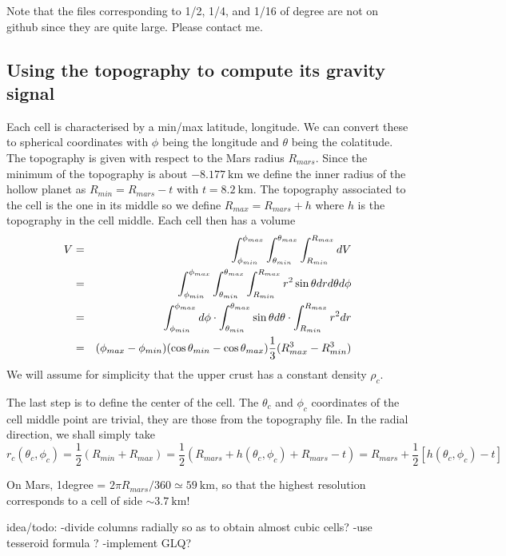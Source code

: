 Note that the files corresponding to 1/2, 1/4, and 1/16 of degree are not on github since they are quite large. 
Please contact me.

\subsection*{Using the topography to compute its gravity signal}

Each cell is characterised by a min/max latitude, longitude. We can convert these to 
spherical coordinates with $\phi$ being the longitude and $\theta$ being the colatitude.
The topography is given with respect to the Mars radius $R_{mars}$. Since the minimum 
of the topography is about $-8.177~\si{\km}$ we define the inner radius of the hollow planet 
as $R_{min}=R_{mars}-t$ with $t=8.2~\si{\km}$. The topography associated to the cell 
is the one in its middle so we define $R_{max}=R_{mars}+h$ where $h$ is the topography 
in the cell middle. Each cell then has a volume
\begin{eqnarray}
V
&=&
\int_{\phi_{min}}^{\phi_{max}}
\int_{\theta_{min}}^{\theta_{max}}
\int_{R_{min}}^{R_{max}}
dV \nonumber\\
&=&
\int_{\phi_{min}}^{\phi_{max}}
\int_{\theta_{min}}^{\theta_{max}}
\int_{R_{min}}^{R_{max}}
r^2 \sin\theta dr d\theta d\phi \nonumber\\
&=&
\int_{\phi_{min}}^{\phi_{max}} d\phi \cdot
\int_{\theta_{min}}^{\theta_{max}} \sin\theta d\theta \cdot 
\int_{R_{min}}^{R_{max}} r^2 dr\nonumber\\
&=&
(\phi_{max} -\phi_{min})
(\cos \theta_{min} -\cos\theta_{max})
\frac13 (R_{max}^3-R_{min}^3)
\end{eqnarray}
We will assume for simplicity that the upper crust has a constant density $\rho_c$. 

The last step is to define the center of the cell. The $\theta_c$ and $\phi_c$ 
coordinates of the cell middle point are trivial, they are those from the 
topography file. In the radial direction, we shall simply take
\[
r_c(\theta_c,\phi_c)=\frac12( R_{min}+R_{max})=\frac12 (R_{mars}+h(\theta_c,\phi_c)+R_{mars}-t)= R_{mars} + \frac12[h(\theta_c,\phi_c)-t]
\]

On Mars, 1degree = $2\pi R_{mars}/360 \simeq 59~\si{\km}$, so that the highest resolution
corresponds to a cell of side $\sim 3.7~\si{\km}$!

idea/todo: 
-divide columns radially so as to obtain almost cubic cells?
-use tesseroid formula ?
-implement GLQ?

